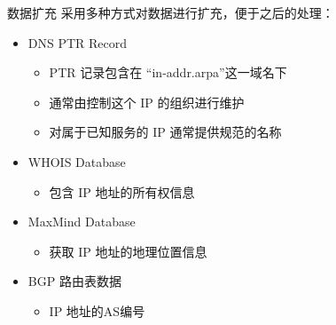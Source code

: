 \documentclass{beamer}
\begin{document}
\begin{frame}{数据扩充}
  采用多种方式对数据进行扩充，便于之后的处理：
  \begin{itemize}
    \item DNS PTR Record
    \begin{itemize}
      \item PTR 记录包含在 “in-addr.arpa”这一域名下
      \item 通常由控制这个 IP 的组织进行维护
      \item 对属于已知服务的 IP 通常提供规范的名称
    \end{itemize}
    \item WHOIS Database
    \begin{itemize}
      \item 包含 IP 地址的所有权信息
    \end{itemize}
    \item MaxMind Database
    \begin{itemize}
      \item 获取 IP 地址的地理位置信息
    \end{itemize}
    \item BGP 路由表数据
    \begin{itemize}
      \item IP 地址的AS编号
    \end{itemize}
  \end{itemize}
  
\end{frame}
\end{document}
